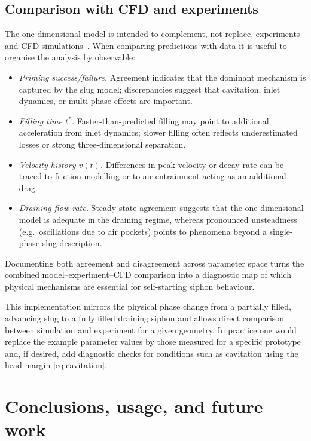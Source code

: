 \documentclass[11pt]{article}
\begin{document}
\subsection{Comparison with CFD and experiments}

The one-dimensional model is intended to complement, not replace, experiments and CFD
simulations~\cite{openfoam,ansys_fluent}. When comparing predictions with data it is useful
to organise the analysis by observable:
\begin{itemize}
  \item \emph{Priming success/failure.} Agreement indicates that the dominant mechanism is
        captured by the slug model; discrepancies suggest that cavitation, inlet dynamics, or
        multi-phase effects are important.
  \item \emph{Filling time $t^*$.} Faster-than-predicted filling may point to additional
        acceleration from inlet dynamics; slower filling often reflects underestimated losses
        or strong three-dimensional separation.
  \item \emph{Velocity history $v(t)$.} Differences in peak velocity or decay rate can be
        traced to friction modelling or to air entrainment acting as an additional drag.
  \item \emph{Draining flow rate.} Steady-state agreement suggests that the one-dimensional
        model is adequate in the draining regime, whereas pronounced unsteadiness (e.g.\
        oscillations due to air pockets) points to phenomena beyond a single-phase slug
        description.
\end{itemize}
Documenting both agreement and disagreement across parameter space turns the combined
model--experiment--CFD comparison into a diagnostic map of which physical mechanisms are
essential for self-starting siphon behaviour.

This implementation mirrors the physical phase change from a partially filled, advancing slug
to a fully filled draining siphon and allows direct comparison between simulation and
experiment for a given geometry. In practice one would replace the example parameter values
by those measured for a specific prototype and, if desired, add diagnostic checks for
conditions such as cavitation using the head margin \eqref{eq:cavitation}.

\section{Conclusions, usage, and future work}
\label{sec:conclusions}
\end{document}
